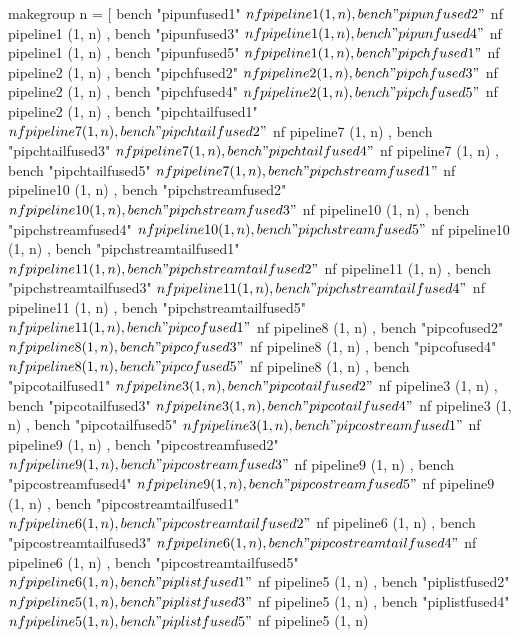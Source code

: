 {\begin{code}
makegroup n = [ 
      bench "pipunfused1" $ nf pipeline1 (1, n)
    , bench "pipunfused2" $ nf pipeline1 (1, n)
    , bench "pipunfused3" $ nf pipeline1 (1, n)
    , bench "pipunfused4" $ nf pipeline1 (1, n)
    , bench "pipunfused5" $ nf pipeline1 (1, n)
    , bench "pipchfused1" $ nf pipeline2 (1, n)
    , bench "pipchfused2" $ nf pipeline2 (1, n)
    , bench "pipchfused3" $ nf pipeline2 (1, n)
    , bench "pipchfused4" $ nf pipeline2 (1, n)
    , bench "pipchfused5" $ nf pipeline2 (1, n)
    , bench "pipchtailfused1" $ nf pipeline7 (1, n)
    , bench "pipchtailfused2" $ nf pipeline7 (1, n)
    , bench "pipchtailfused3" $ nf pipeline7 (1, n)
    , bench "pipchtailfused4" $ nf pipeline7 (1, n)
    , bench "pipchtailfused5" $ nf pipeline7 (1, n)
    , bench "pipchstreamfused1" $ nf pipeline10 (1, n)
    , bench "pipchstreamfused2" $ nf pipeline10 (1, n)
    , bench "pipchstreamfused3" $ nf pipeline10 (1, n)
    , bench "pipchstreamfused4" $ nf pipeline10 (1, n)
    , bench "pipchstreamfused5" $ nf pipeline10 (1, n)
    , bench "pipchstreamtailfused1" $ nf pipeline11 (1, n)
    , bench "pipchstreamtailfused2" $ nf pipeline11 (1, n)
    , bench "pipchstreamtailfused3" $ nf pipeline11 (1, n)
    , bench "pipchstreamtailfused4" $ nf pipeline11 (1, n)
    , bench "pipchstreamtailfused5" $ nf pipeline11 (1, n)
    , bench "pipcofused1" $ nf pipeline8 (1, n)
    , bench "pipcofused2" $ nf pipeline8 (1, n)
    , bench "pipcofused3" $ nf pipeline8 (1, n)
    , bench "pipcofused4" $ nf pipeline8 (1, n)
    , bench "pipcofused5" $ nf pipeline8 (1, n)
    , bench "pipcotailfused1" $ nf pipeline3 (1, n)
    , bench "pipcotailfused2" $ nf pipeline3 (1, n)
    , bench "pipcotailfused3" $ nf pipeline3 (1, n)
    , bench "pipcotailfused4" $ nf pipeline3 (1, n)
    , bench "pipcotailfused5" $ nf pipeline3 (1, n)
    , bench "pipcostreamfused1" $ nf pipeline9 (1, n)
    , bench "pipcostreamfused2" $ nf pipeline9 (1, n)
    , bench "pipcostreamfused3" $ nf pipeline9 (1, n)
    , bench "pipcostreamfused4" $ nf pipeline9 (1, n)
    , bench "pipcostreamfused5" $ nf pipeline9 (1, n)
    , bench "pipcostreamtailfused1" $ nf pipeline6 (1, n)
    , bench "pipcostreamtailfused2" $ nf pipeline6 (1, n)
    , bench "pipcostreamtailfused3" $ nf pipeline6 (1, n)
    , bench "pipcostreamtailfused4" $ nf pipeline6 (1, n)
    , bench "pipcostreamtailfused5" $ nf pipeline6 (1, n)
    , bench "piplistfused1" $ nf pipeline5 (1, n)
    , bench "piplistfused2" $ nf pipeline5 (1, n)
    , bench "piplistfused3" $ nf pipeline5 (1, n)
    , bench "piplistfused4" $ nf pipeline5 (1, n)
    , bench "piplistfused5" $ nf pipeline5 (1, n)

\end{code}}
